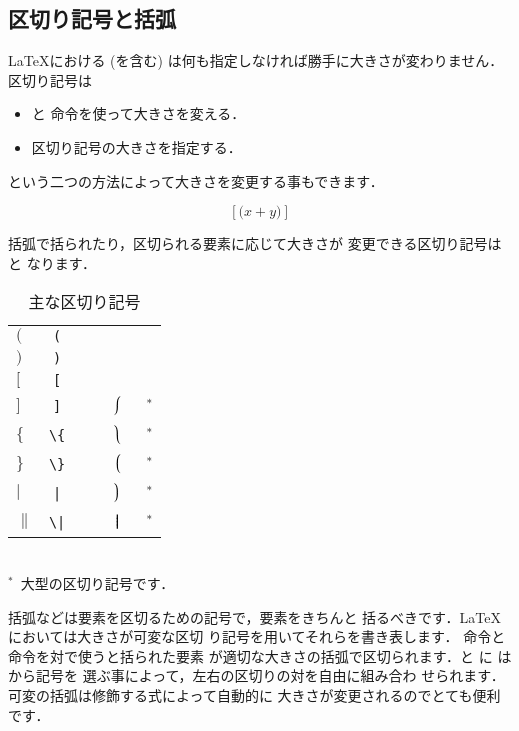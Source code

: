 \subsection{区切り記号と括弧}
%
{\LaTeX}における{} (を含む) 
は何も指定しなければ勝手に大きさが変わりません．
区切り記号は
\begin{itemize}
 \item {}と 命令を使って大きさを変える．
 \item 区切り記号の大きさを指定する．
\end{itemize}
という二つの方法によって大きさを変更する事もできます．
\begin{InOut}
\begin{displaymath}
\left[ \Big(x+y\Big) \right]
\end{displaymath} 
\end{InOut}
括弧で括られたり，区切られる要素に応じて大きさが
変更できる区切り記号はと
なります．
\begin{table}[htbp]
\begin{scenter}
\caption{主な区切り記号}
%
%
%
\index{"[@\verb+[+}%
\index{"]@\verb+]+}%
\begin{tabular}{LCCC}
$($ &\verb+(+ &    & & \\
$)$ &\verb+)+ &    & &     \\
$[$ &\verb+[+ & & &   \\
$]$ &\verb+]+ & & & 
 $\big\lmoustache$&~${}^*$\\
$\{$&\verb+\{+& &      &   
 $\big\rmoustache$&~${}^*$\\
$\}$&\verb+\}+& &      &      
 $\big\lgroup$&~${}^*$\\
$|$ &\verb+|+ & &   &      
 $\big\rgroup$&~${}^*$\\
$\|$&\verb+\|+& & &      
 $\big\bracevert$&~${}^*$
\end{tabular}
\\ {\small${}^{*}$\ 大型の区切り記号です．}
\end{scenter}
\end{table}
括弧などは要素を区切るための記号で，要素をきちんと
括るべきです．{\LaTeX}においては大きさが可変な区切
り記号を用いてそれらを書き表します．
命令と命令を対で使うと括られた要素
が適切な大きさの括弧で区切られます．と  に
はから記号を
選ぶ事によって，左右の区切りの対を自由に組み合わ
せられます．可変の括弧は修飾する式によって自動的に
大きさが変更されるのでとても便利です．

